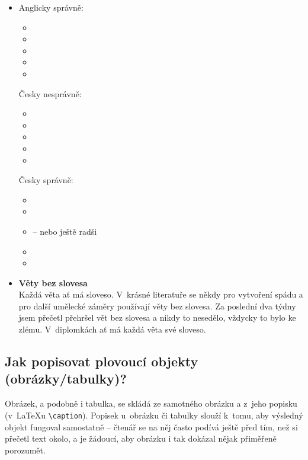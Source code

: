 \begin{itemize}
	\item
    {
    	Anglicky správně: 
        \begin{itemize}
        	\item{}
  			\item{}
  			\item{}
  			\item{}
  			\item{}
        \end{itemize}
        
        Česky nesprávně:
		\begin{itemize}
  			\item{}
  			\item{}
  			\item{}
  			\item{}
  			\item{}
		\end{itemize}

		Česky správně:
		\begin{itemize}
  			\item{}
  			\item{}
  			\item{ -- nebo ještě radši }
  			\item{}
  			\item{}
		\end{itemize}
        
    } 
    \item
    {
    	\textbf{Věty bez slovesa} \\    
		Každá věta ať má sloveso. V~krásné literatuře se někdy pro vytvoření spádu a pro další umělecké záměry používají věty bez slovesa. Za poslední dva týdny jsem přečetl přehršel vět bez slovesa a nikdy to nesedělo, vždycky to bylo ke zlému. V~diplomkách ať má každá věta své sloveso.
    }
\end{itemize}



\subsection*{Jak popisovat plovoucí objekty (obrázky/tabulky)?}
Obrázek, a podobně i tabulka, se skládá ze samotného obrázku a z~jeho popisku (v~\LaTeX u \texttt{\textbackslash caption}). Popisek u~obrázku či tabulky slouží k~tomu, aby výsledný objekt fungoval samostatně -- čtenář se na něj často podívá ještě před tím, než si přečetl text okolo, a je žádoucí, aby obrázku i tak dokázal nějak přiměřeně porozumět.

